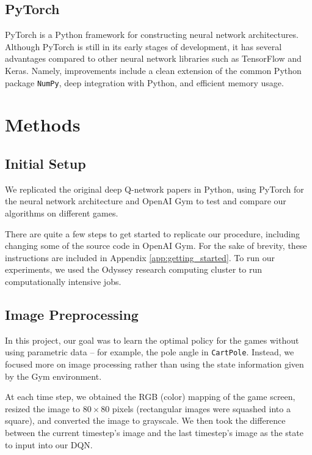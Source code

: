 \documentclass[11pt]{article}
\newcommand{\cp}{\texttt{CartPole}}
\begin{document}
\subsection{PyTorch}

PyTorch \cite{paszke2017pytorch} is a Python framework for constructing neural network architectures. Although PyTorch is still in its early stages of development, it has several advantages compared to other neural network libraries such as TensorFlow and Keras. Namely, improvements include a clean extension of the common Python package \texttt{NumPy}, deep integration with Python, and efficient memory usage. 

\section{Methods}

\subsection{Initial Setup}

We replicated the original deep Q-network papers \cite{mnih2013playing, mnih2015human} in Python, using PyTorch \cite{paszke2017pytorch} for the neural network architecture and OpenAI Gym \cite{brockman2016openai} to test and compare our algorithms on different games. 

There are quite a few steps to get started to replicate our procedure, including changing some of the source code in OpenAI Gym. For the sake of brevity, these instructions are included in Appendix \ref{app:getting_started}. To run our experiments, we used the Odyssey research computing cluster to run computationally intensive jobs.

\subsection{Image Preprocessing}

In this project, our goal was to learn the optimal policy for the games without using parametric data -- for example, the pole angle in \cp. Instead, we focused more on image processing rather than using the state information given by the Gym environment.

At each time step, we obtained the RGB (color) mapping of the game screen, resized the image to $80 \times 80$ pixels (rectangular images were squashed into a square), and converted the image to grayscale. We then took the difference between the current timestep's image and the last timestep's image as the state to input into our DQN. 
\end{document}
